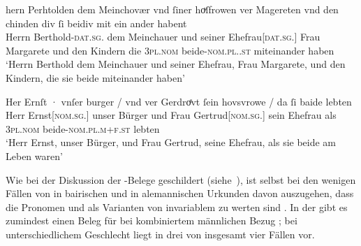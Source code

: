 \begin{exe}
\ex \label{ex:m+f_si_beide_iu}
	\begin{xlist}
	\ex \label{ex:m+f_si_beidiu}
		\gll hern Perhtolden dem Meinchovær vnd ſiner hoͮſfrowen ver Magereten
				vnd den chinden div ſi beidiv {mit ein ander} habent \\
			Herrn Berthold-\textsc{dat.sg.\MascM} dem Meinchauer und seiner
				Ehefrau[\textsc{dat.sg.\FemF}] Frau Margarete und den Kindern
				die \textsc{3pl\subMF.nom} beide-\textsc{nom.pl.\NeutMF.st}
				miteinander haben \\
		\trans `Herrn Berthold dem Meinchauer und seiner Ehefrau, Frau
			Margarete, und den Kindern, die sie beide miteinander haben'
			\parencites(Nr.~937, Regensburg, 1287)[292,40--41]{cao2}

	\ex \label{ex:m+f_si_beide}
		\gll Her Ernſt · vnſer burger / vnd ver Gerdroͤvt ſein hovsvrowe / da
				ſi baide lebten \\
			Herr Ernst[\textsc{nom.sg.\MascM}] {} unser Bürger {} und Frau
				Gertrud[\textsc{nom.sg.\FemF}] sein Ehefrau {} als
				\textsc{3pl\subMF.nom} beide-\textsc{nom.pl.m+f\subMF.st}
				lebten \\
		\trans `Herr Ernst, unser Bürger, und Frau Gertrud, seine Ehefrau,
			als sie beide am Leben waren'
			\parencites(Nr.~1073, Wien, 1289)[374,40--41]{cao2}
	\end{xlist}
\end{exe}

Wie bei der Diskussion der \CAO{}-Belege geschildert
(siehe~), ist selbst bei den wenigen Fällen von
 in bairischen und  in alemannischen Urkunden
davon auszugehen, dass die Pronomen  und  als Varianten von
invariablem  zu werten sind \autocite[vgl.][394--396]{ksw2}. In der
\KC{} gibt es zumindest einen Beleg für  bei kombiniertem
männlichen Bezug ; bei unterschiedlichem Geschlecht liegt
 in drei von insgesamt vier Fällen vor.

